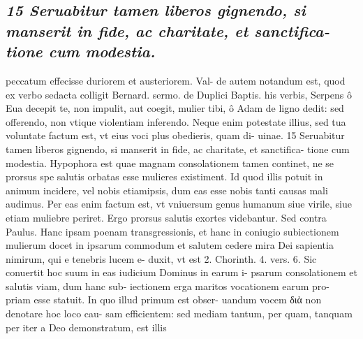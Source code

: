 \documentclass{article}
\begin{document}
\begin{pages}
\subsection*{\textit{15 Seruabitur tamen liberos gignendo, si manserit in fide, ac charitate, et sanctifica- tione cum modestia.}}peccatum effecisse duriorem et austeriorem. Val- de autem notandum est, quod ex verbo sedacta colligit Bernard. sermo. de Duplici Baptis. his verbis, Serpens ô Eua decepit te, non impulit, aut coegit, mulier tibi, ô Adam de ligno dedit: sed offerendo, non vtique violentiam inferendo. Neque enim potestate illius, sed tua voluntate factum est, vt eius voci plus obedieris, quam di- uinae. 15 Seruabitur tamen liberos gignendo, si manserit in fide, ac charitate, et sanctifica- tione cum modestia. Hypophora est quae magnam consolationem tamen continet, ne se prorsus spe salutis orbatas esse mulieres existiment. Id quod illis potuit in animum incidere, vel nobis etiamipsis, dum eas esse nobis tanti causas mali audimus. Per eas enim factum est, vt vniuersum genus humanum siue virile, siue etiam muliebre periret. Ergo prorsus salutis exortes videbantur. Sed contra Paulus. Hanc ipsam poenam transgressionis, et hanc in coniugio subiectionem mulierum docet in ipsarum commodum et salutem cedere mira Dei sapientia nimirum, qui e tenebris lucem e- duxit, vt est 2. Chorinth. 4. vers. 6. Sic conuertit hoc suum in eas iudicium Dominus in earum i- psarum consolationem et salutis viam, dum hanc sub- iectionem erga maritos vocationem earum pro- priam esse statuit. In quo illud primum est obser- uandum vocem διὰ non denotare hoc loco cau- sam efficientem: sed mediam tantum, per quam, tanquam per iter a Deo demonstratum, est illis  \pend

\end{pages}
\end{document}
